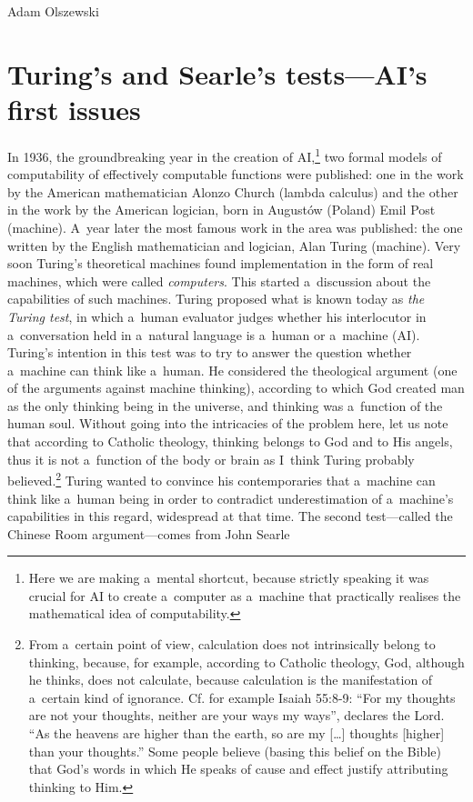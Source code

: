 \begin{artengenv}{Adam Olszewski}
\section{Turing's and Searle's tests---AI's first issues}
In 1936, the groundbreaking year in the creation of AI,\footnote{Here we are making a~mental shortcut, because strictly speaking it was crucial for AI to create a~computer as a~machine that practically realises the mathematical idea of computability.} two formal models of computability of effectively computable functions were published: one in the work by the American mathematician Alonzo Church (lambda calculus) and the other in the work by the American logician, born in Augustów (Poland) Emil Post (machine). A~year later the most famous work in the area was published: the one written by the English mathematician and logician, Alan Turing (machine). Very soon Turing's theoretical machines found implementation in the form of real machines, which were called \textit{computers}. This started a~discussion about the capabilities of such machines. Turing
\parencite*[][]{turing_computing_1950} %
 proposed what is known today as \textit{the Turing test}, in which a~human evaluator judges whether his interlocutor in a~conversation held in a~natural language is a~human or a~machine (AI). Turing's intention in this test was to try to answer the question whether a~machine can think like a~human. He considered the theological argument (one of the arguments against machine thinking), according to which God created man as the only thinking being in the universe, and thinking was a~function of the human soul. Without going into the intricacies of the problem here, let us note that according to Catholic theology, thinking belongs to God and to His angels, thus it is not a~function of the body or brain as I~think Turing probably believed.\footnote{From a~certain point of view, calculation does not intrinsically belong to thinking, because, for example, according to Catholic theology, God, although he thinks, does not calculate, because calculation is the manifestation of a~certain kind of ignorance. Cf. for example Isaiah 55:8-9: ``For my thoughts are not your thoughts, neither are your ways my ways'', declares the Lord. ``As the heavens are higher than the earth, so are my [\ldots] thoughts [higher] than your thoughts.'' Some people believe (basing this belief on the Bible) that God's words in which He speaks of cause and effect justify attributing thinking to Him.} Turing wanted to convince his contemporaries that a~machine can think like a~human being in order to contradict underestimation of a~machine's capabilities in this regard, widespread at that time. The second test---called the Chinese Room argument---comes from John Searle 

\end{artengenv}
